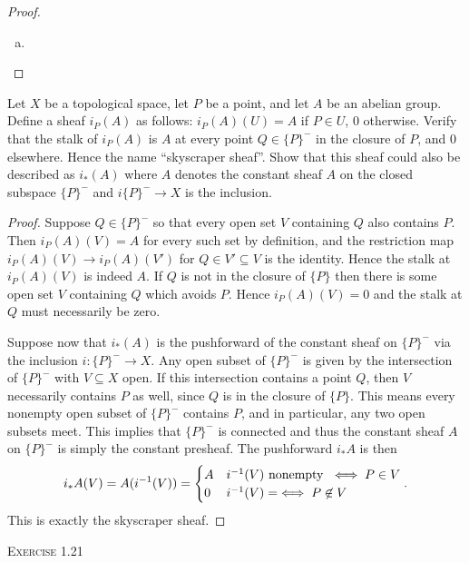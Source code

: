 \begin{problemset}
\begin{proof}
\begin{enumerate}[(a)]
			\item 
		\end{enumerate}
	\end{proof}
	\item Let $X$ be a topological space, let $P$ be a point, and let $A$ be an abelian group. Define a sheaf $i_P(A)$ as follows: $i_P(A)(U) = A$ if $P\in U$, $0$ otherwise. Verify that the stalk of $i_P(A)$ is $A$ at every point $Q\in \{P\}^-$ in the closure of $P$, and $0$ elsewhere. Hence the name ``skyscraper sheaf''. Show that this sheaf could also be described as $i_*(A)$ where $A$ denotes the constant sheaf $A$ on the closed subspace $\{P\}^-$ and $i\{P\}^-\to X$ is the inclusion.
	\begin{proof}
		Suppose $Q\in \{P\}^-$ so that every open set $V$ containing $Q$ also contains $P$. Then $i_P(A)(V) = A$ for every such set by definition, and the restriction map $i_P(A)(V) \to i_P(A)(V')$ for $Q \in V' \subseteq V$ is the identity. Hence the stalk at $i_P(A)(V)$ is indeed $A$. If $Q$ is not in the closure of $\{P\}$ then there is some open set $V$ containing $Q$ which avoids $P$. Hence $i_P(A)(V) = 0$ and the stalk at $Q$ must necessarily be zero.

		Suppose now that $i_*(A)$ is the pushforward of the constant sheaf on $\{P\}^-$ via the inclusion $i:\{P\}^-\to X$. Any open subset of $\{P\}^-$ is given by the intersection of $\{P\}^-$ with $V\subseteq X$ open. If this intersection contains a point $Q$, then $V$ necessarily contains $P$ as well, since $Q$ is in the closure of $\{P\}$. This means every nonempty open subset of $\{P\}^-$ contains $P$, and in particular, any two open subsets meet. This implies that $\{P\}^-$ is connected and thus the constant sheaf $A$ on $\{P\}^-$ is simply the constant presheaf. The pushforward $i_*A$ is then
		\begin{align*}
			i_*A(V) = A(i^{-1}(V)) =
			\begin{cases}
				A & i^{-1}(V) \text{ nonempty } \iff P\in V\\
				0 & i^{-1}(V) = \empty \iff P\not\in V
			\end{cases}.
		\end{align*}
		This is exactly the skyscraper sheaf.
	\end{proof}
\item[\textsc{Exercise 1.21}] \label{prob:2_1_21}
\end{problemset}
